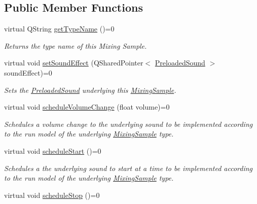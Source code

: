 \subsection*{Public Member Functions}
\begin{DoxyCompactItemize}
\item 
\hypertarget{class_picto_1_1_mixing_sample_a8fa7b17971c7ec384de6f33a969a41e7}{virtual Q\-String \hyperlink{class_picto_1_1_mixing_sample_a8fa7b17971c7ec384de6f33a969a41e7}{get\-Type\-Name} ()=0}\label{class_picto_1_1_mixing_sample_a8fa7b17971c7ec384de6f33a969a41e7}

\begin{DoxyCompactList}\small\item\em Returns the type name of this Mixing Sample. \end{DoxyCompactList}\item 
virtual void \hyperlink{class_picto_1_1_mixing_sample_a3e35f68b929f1bce4610da3acf4f9bfb}{set\-Sound\-Effect} (Q\-Shared\-Pointer$<$ \hyperlink{class_picto_1_1_preloaded_sound}{Preloaded\-Sound} $>$ sound\-Effect)=0
\begin{DoxyCompactList}\small\item\em Sets the \hyperlink{class_picto_1_1_preloaded_sound}{Preloaded\-Sound} underlying this \hyperlink{class_picto_1_1_mixing_sample}{Mixing\-Sample}. \end{DoxyCompactList}\item 
\hypertarget{class_picto_1_1_mixing_sample_a2bdbed952aef586fd2d3a802aab0e004}{virtual void \hyperlink{class_picto_1_1_mixing_sample_a2bdbed952aef586fd2d3a802aab0e004}{schedule\-Volume\-Change} (float volume)=0}\label{class_picto_1_1_mixing_sample_a2bdbed952aef586fd2d3a802aab0e004}

\begin{DoxyCompactList}\small\item\em Schedules a volume change to the underlying sound to be implemented according to the run model of the underlying \hyperlink{class_picto_1_1_mixing_sample}{Mixing\-Sample} type. \end{DoxyCompactList}\item 
\hypertarget{class_picto_1_1_mixing_sample_afe28101bad0e371ad2664220a2f13f61}{virtual void \hyperlink{class_picto_1_1_mixing_sample_afe28101bad0e371ad2664220a2f13f61}{schedule\-Start} ()=0}\label{class_picto_1_1_mixing_sample_afe28101bad0e371ad2664220a2f13f61}

\begin{DoxyCompactList}\small\item\em Schedules a the underlying sound to start at a time to be implemented according to the run model of the underlying \hyperlink{class_picto_1_1_mixing_sample}{Mixing\-Sample} type. \end{DoxyCompactList}\item 
\hypertarget{class_picto_1_1_mixing_sample_a0de99d405334f14682c87b812726a034}{virtual void \hyperlink{class_picto_1_1_mixing_sample_a0de99d405334f14682c87b812726a034}{schedule\-Stop} ()=0}\label{class_picto_1_1_mixing_sample_a0de99d405334f14682c87b812726a034}


\end{DoxyCompactItemize}
